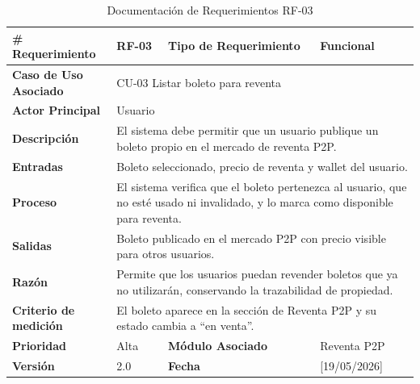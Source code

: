 \documentclass[12pt,letterpaper]{article}
\begin{document}
\begin{table}[H]
\centering
\scriptsize
\renewcommand{\arraystretch}{1.05}
\setlength{\tabcolsep}{3pt}

\newlength{\anchoceldaRFtres}
\setlength{\anchoceldaRFtres}{\dimexpr\textwidth-2.7cm-8\tabcolsep-5\arrayrulewidth\relax}

\begin{tabularx}{\textwidth}{|p{2.7cm}|X|p{2.8cm}|X|}
\hline
\textbf{\# Requerimiento} & RF-03 & \textbf{Tipo de Requerimiento} & Funcional \\ \hline

\textbf{Caso de Uso Asociado} & 
\multicolumn{3}{p{\anchoceldaRFtres}|}{CU-03 Listar boleto para reventa} \\ \hline

\textbf{Actor Principal} & 
\multicolumn{3}{p{\anchoceldaRFtres}|}{Usuario} \\ \hline

\textbf{Descripción} & 
\multicolumn{3}{p{\anchoceldaRFtres}|}{El sistema debe permitir que un usuario publique un boleto propio en el mercado de reventa P2P.} \\ \hline

\textbf{Entradas} & 
\multicolumn{3}{p{\anchoceldaRFtres}|}{Boleto seleccionado, precio de reventa y wallet del usuario.} \\ \hline

\textbf{Proceso} & 
\multicolumn{3}{p{\anchoceldaRFtres}|}{El sistema verifica que el boleto pertenezca al usuario, que no esté usado ni invalidado, y lo marca como disponible para reventa.} \\ \hline

\textbf{Salidas} & 
\multicolumn{3}{p{\anchoceldaRFtres}|}{Boleto publicado en el mercado P2P con precio visible para otros usuarios.} \\ \hline

\textbf{Razón} & 
\multicolumn{3}{p{\anchoceldaRFtres}|}{Permite que los usuarios puedan revender boletos que ya no utilizarán, conservando la trazabilidad de propiedad.} \\ \hline

\textbf{Criterio de medición} & 
\multicolumn{3}{p{\anchoceldaRFtres}|}{El boleto aparece en la sección de Reventa P2P y su estado cambia a ``en venta''.} \\ \hline

\textbf{Prioridad} & Alta & \textbf{Módulo Asociado} & Reventa P2P \\ \hline

\textbf{Versión} & 2.0 & \textbf{Fecha} & [19/05/2026] \\ \hline

\end{tabularx}

\caption{Documentación de Requerimientos RF-03}
\label{tab:documentacion_requerimientos_rf03}
\normalsize
\end{table}
\end{document}
